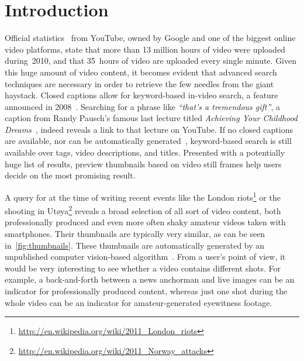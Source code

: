 \documentclass[runningheads,a4paper]{llncs}
\begin{document}
\section{Introduction}
Official statistics~\cite{youtube:stats} from YouTube, owned by Google and one of the biggest online video platforms, state that more than 13 million hours of video were uploaded during~2010, and that 35~hours of video are uploaded every single minute. Given this huge amount of video content, it becomes evident that advanced search techniques are necessary in order to retrieve the few needles from the giant haystack. Closed captions allow for keyword-based in-video search, a feature announced in 2008~\cite{googlevideo}. Searching for a phrase like \emph{``that's a tremendous gift''}, a caption from Randy Pausch's famous last lecture titled \emph{Achieving Your Childhood Dreams}~\cite{pausch}, indeed reveals a link to that lecture on YouTube. If no closed captions are available, nor can be automatically generated~\cite{youtubecaptions}, keyword-based search is still available over tags, video descriptions, and titles. Presented with a potentially huge list of results, preview thumbnails based on video still frames help users decide on the most promising result.

A query for at the time of writing recent events like the London riots\footnote{\url{http://en.wikipedia.org/wiki/2011_London_riots}} or the shooting in Ut\o ya\footnote{\url{http://en.wikipedia.org/wiki/2011_Norway_attacks}} reveals a broad selection of all sort of video content, both professionally produced and even more often shaky amateur videos taken with smartphones. Their thumbnails are typically very similar, as can be seen in~\autoref{fig:thumbnails}. These thumbnails are automatically generated by an unpublished computer vision-based algorithm~\cite{googleresearch}. From a user's point of view, it would be very interesting to see whether a video contains different shots. For example, a back-and-forth between a news anchorman and live images can be an indicator for professionally  produced content, whereas just one shot during the whole video can be an indicator for amateur-generated eyewitness footage.
\end{document}

